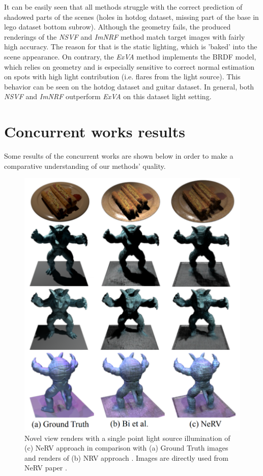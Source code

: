It can be easily seen that all methods struggle
with the correct prediction of shadowed parts of the scenes
(holes in hotdog dataset, missing part of the base in lego dataset bottom subrow).
Although the geometry fails, the produced renderings
of the \textit{NSVF} and \textit{ImNRF} method match target images with fairly high accuracy.
The reason for that is the static lighting, which is 'baked' into the scene appearance.
On contrary, the \textit{ExVA} method implements the BRDF model,
which relies on geometry and is especially sensitive to correct normal estimation
on spots with high light contribution (i.e. flares from the light source).
This behavior can be seen on the hotdog dataset and guitar dataset.
In general, both \textit{NSVF} and \textit{ImNRF} outperform \textit{ExVA} on this dataset light setting.



\section{Concurrent works results}

Some results of the concurrent works are shown below
in order to make a comparative understanding of our methods' quality.

\begin{figure}[!htb]
    \centering
    \includegraphics[width=\textwidth]{figures/concurrent/nerv.png}
    \caption{Novel view renders with a single point light source illumination of (c) NeRV approach \cite{nerv2021}
    in comparison with (a) Ground Truth images and renders of (b) NRV approach \cite{bi2020neural}.
    Images are directly used from NeRV paper \cite{nerv2021}.
    }
    \label{fig:concur_nerv}
\end{figure}


